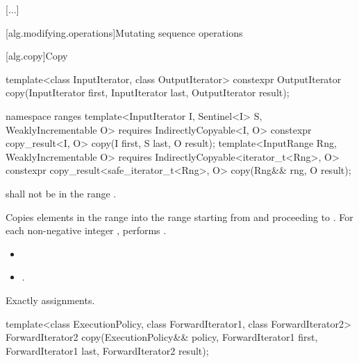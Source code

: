 [...]

[alg.modifying.operations]{Mutating sequence operations}

[alg.copy]{Copy}

%
\begin{itemdecl}
template<class InputIterator, class OutputIterator>
  constexpr OutputIterator copy(InputIterator first, InputIterator last,
                                OutputIterator result);
\end{itemdecl}\begin{addedblock}\begin{itemdecl}
namespace ranges {
  template<InputIterator I, Sentinel<I> S, WeaklyIncrementable O>
    requires IndirectlyCopyable<I, O>
    constexpr copy_result<I, O>
      copy(I first, S last, O result);
  template<InputRange Rng, WeaklyIncrementable O>
    requires IndirectlyCopyable<iterator_t<Rng>, O>
    constexpr copy_result<safe_iterator_t<Rng>, O>
      copy(Rng&& rng, O result);
}
\end{itemdecl}\end{addedblock}

\begin{itemdescr}
\pnum
\requires {} shall not be in the range .

\pnum
\effects
Copies elements in the range 
into the range 
starting from  and proceeding to .
For each non-negative integer 
, performs
.

\pnum
\returns
\begin{itemize}
\item {} 
\item {}.
\end{itemize}

\pnum
\complexity Exactly  assignments.
\end{itemdescr}

%
\begin{itemdecl}
template<class ExecutionPolicy, class ForwardIterator1, class ForwardIterator2>
  ForwardIterator2 copy(ExecutionPolicy&& policy,
                        ForwardIterator1 first, ForwardIterator1 last,
                        ForwardIterator2 result);
\end{itemdecl}

